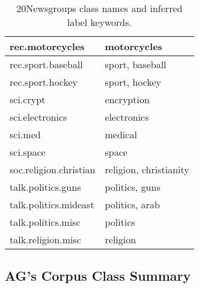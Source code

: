\documentclass[sigconf]{acmart}
\begin{document}
\begin{table}[!h]
{\begin{tabular}{|l|l|}
    rec.motorcycles                           & motorcycles                                                                   \\ \hline
    rec.sport.baseball                        & sport, baseball                                                               \\ \hline
    rec.sport.hockey                          & sport, hockey                                                                 \\ \hline
    sci.crypt                                 & encryption                                                                    \\ \hline
    sci.electronics                           & electronics                                                                   \\ \hline
    sci.med                                   & medical                                                                       \\ \hline
    sci.space                                 & space                                                                         \\ \hline
    soc.religion.christian                    & religion, christianity                                                        \\ \hline
    talk.politics.guns                        & politics, guns                                                                \\ \hline
    talk.politics.mideast                     & politics, arab                                                                \\ \hline
    talk.politics.misc                        & politics                                                                      \\ \hline
    talk.religion.misc                        & religion                                                                      \\ \hline
    \end{tabular}}
    \caption{\label{tab:20news}20Newsgroups class names and inferred label keywords.}
\end{table}

\subsection{AG's Corpus Class Summary}\label{sec:appendix_ag}
\end{document}
